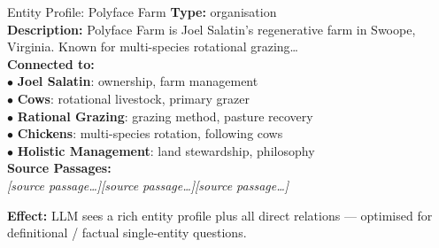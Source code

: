 \documentclass{article}
\newcommand{\passagemark}{\textit{\color{gray}\scriptsize [source passage\ldots]}}
\begin{document}
\begin{minipage}[t]{0.487\textwidth}
\begin{profilebox}{Entity Profile: Polyface Farm}
\scriptsize\sffamily
\textbf{Type:} organisation\\
\textbf{Description:} Polyface Farm is Joel Salatin's regenerative farm in
Swoope, Virginia. Known for multi-species rotational grazing\ldots\\[3pt]
\textbf{Connected to:}\\
\quad $\bullet$ \textbf{Joel Salatin}: ownership, farm management\\
\quad $\bullet$ \textbf{Cows}: rotational livestock, primary grazer\\
\quad $\bullet$ \textbf{Rational Grazing}: grazing method, pasture recovery\\
\quad $\bullet$ \textbf{Chickens}: multi-species rotation, following cows\\
\quad $\bullet$ \textbf{Holistic Management}: land stewardship, philosophy\\[3pt]
\textbf{Source Passages:}\\
\passagemark\quad \passagemark\quad \passagemark
\end{profilebox}

\vspace{4pt}
{\scriptsize\sffamily\color{green!50!black!90}
\textbf{Effect:} LLM sees a rich entity profile plus all direct relations — optimised
for definitional / factual single-entity questions.}

\end{minipage}
\hfill
\end{document}
